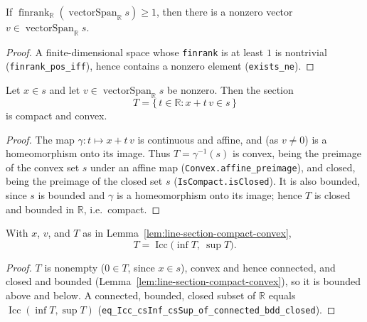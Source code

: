 \begin{lemma}
    \label{lem:exists-direction-vector}
    \leanok
    If $\operatorname{finrank}_{\mathbb R}(\operatorname{vectorSpan}_{\mathbb R} s) \ge 1$,
    then there is a nonzero vector $v \in \operatorname{vectorSpan}_{\mathbb R} s$.
\end{lemma}
\begin{proof}
    A finite-dimensional space whose \texttt{finrank} is at least $1$ is nontrivial
    (\texttt{finrank\_pos\_iff}), hence contains a nonzero element
    (\texttt{exists\_ne}).
\end{proof}

\begin{lemma}
    \label{lem:line-section-compact-convex}
    \leanok
    Let $x \in s$ and let $v \in \operatorname{vectorSpan}_{\mathbb R} s$ be nonzero.
    Then the section
    \[
        T = \{\, t \in \mathbb R : x + t\, v \in s \,\}
    \]
    is compact and convex.
\end{lemma}
\begin{proof}
    The map $\gamma : t \mapsto x + t\, v$ is continuous and affine, and (as
    $v \ne 0$) is a homeomorphism onto its image. Thus $T = \gamma^{-1}(s)$ is
    convex, being the preimage of the convex set $s$ under an affine map
    (\texttt{Convex.affine\_preimage}), and closed, being the preimage of the
    closed set $s$ (\texttt{IsCompact.isClosed}). It is also bounded, since $s$ is
    bounded and $\gamma$ is a homeomorphism onto its image; hence $T$ is closed and
    bounded in $\mathbb R$, i.e.\ compact.
\end{proof}

\begin{lemma}
    \label{lem:line-section-icc}
    \leanok
    With $x$, $v$, and $T$ as in Lemma~\ref{lem:line-section-compact-convex},
    \[
        T = \operatorname{Icc}\!\big(\inf T,\ \sup T\big).
    \]
\end{lemma}
\begin{proof}
    $T$ is nonempty ($0 \in T$, since $x \in s$), convex and hence connected, and
    closed and bounded (Lemma~\ref{lem:line-section-compact-convex}), so it is
    bounded above and below. A connected, bounded, closed subset of $\mathbb R$
    equals $\operatorname{Icc}(\inf T, \sup T)$
    (\texttt{eq\_Icc\_csInf\_csSup\_of\_connected\_bdd\_closed}).
\end{proof}

